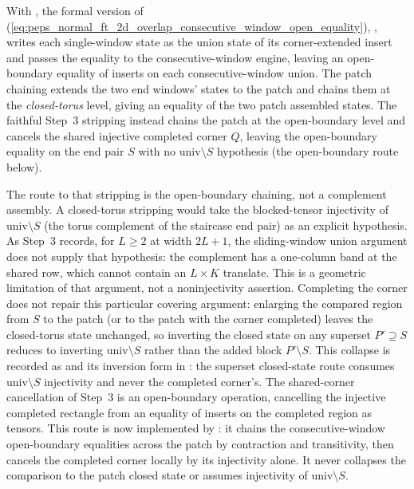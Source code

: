 \documentclass{article}
\begin{document}
With , the formal version of
(\ref{eq:peps_normal_ft_2d_overlap_consecutive_window_open_equality}),
, writes each single-window state
as the union state of its corner-extended insert and passes the equality to
the consecutive-window engine, leaving an open-boundary equality of inserts
on each consecutive-window union. The patch chaining
 extends the two end windows'
states to the patch and chains them at the \emph{closed-torus} level, giving
an equality of the two patch assembled states. The faithful Step~3 stripping
 instead chains the patch at the
open-boundary level and cancels the shared injective completed corner $Q$,
leaving the open-boundary equality on the end pair $S$ with no
$\mathrm{univ} \setminus S$ hypothesis (the open-boundary route below).

The route to that stripping is the open-boundary chaining, not a complement
assembly. A closed-torus stripping would take the blocked-tensor injectivity
of $\mathrm{univ} \setminus S$ (the torus complement of the staircase end
pair) as an explicit hypothesis. As Step~3 records, for $L\geq2$ at
width $2L+1$, the sliding-window union argument does not supply that
hypothesis: the complement has a one-column band at the shared row,
which cannot contain an $L\times K$ translate. This is a geometric
limitation of that argument, not a noninjectivity assertion. Completing
the corner does not repair this particular covering argument: enlarging the compared region from $S$ to the patch (or to the
patch with the corner completed) leaves the closed-torus state unchanged, so
inverting the closed state on any superset $P' \supseteq S$ reduces to
inverting $\mathrm{univ} \setminus S$ rather than the added block $P'
    \setminus S$. This collapse is recorded as
 and its inversion form
in : the superset closed-state route
consumes $\mathrm{univ} \setminus S$ injectivity and never the completed
corner's. The shared-corner cancellation of Step~3 is an open-boundary
operation, cancelling the injective completed rectangle
 from an equality of inserts on the
completed region as tensors. This route is now implemented by
: it chains the consecutive-window
open-boundary equalities across the patch by contraction and transitivity,
then cancels the completed corner locally by its injectivity alone. It never
collapses the comparison to the patch closed state or assumes injectivity of
$\mathrm{univ} \setminus S$.
\end{document}
